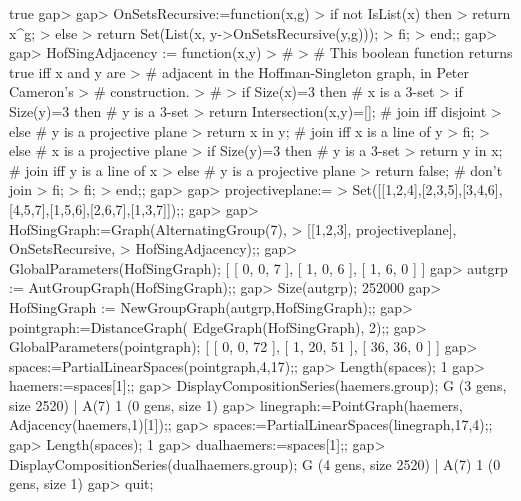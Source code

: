 true
gap> 
gap> OnSetsRecursive:=function(x,g)
> if not IsList(x) then
>   return x^g;     
> else
>   return Set(List(x, y->OnSetsRecursive(y,g)));
> fi;
> end;;
gap> 
gap> HofSingAdjacency := function(x,y)
> #
> # This boolean function returns  true  iff  x  and  y  are 
> # adjacent in the Hoffman-Singleton graph, in Peter Cameron's
> # construction.
> #
> if Size(x)=3 then                  # x is a 3-set
>    if Size(y)=3 then               # y is a 3-set
>       return Intersection(x,y)=[]; # join iff disjoint
>    else                            # y is a projective plane
>       return x in y;               # join iff x is a line of y
>    fi;
> else                               # x is a projective plane
>    if Size(y)=3 then               # y is a 3-set
>       return y in x;               # join iff y is a line of x
>    else                            # y is a projective plane
>       return false;                # don't join
>    fi;
> fi;
> end;;
gap> 
gap> projectiveplane:=
>    Set([[1,2,4],[2,3,5],[3,4,6],[4,5,7],[1,5,6],[2,6,7],[1,3,7]]);;
gap> 
gap> HofSingGraph:=Graph(AlternatingGroup(7), 
>                     [[1,2,3], projectiveplane], OnSetsRecursive,
>                     HofSingAdjacency);;
gap> GlobalParameters(HofSingGraph);
[ [ 0, 0, 7 ], [ 1, 0, 6 ], [ 1, 6, 0 ] ]
gap> autgrp := AutGroupGraph(HofSingGraph);;
gap> Size(autgrp);
252000
gap> HofSingGraph := NewGroupGraph(autgrp,HofSingGraph);;
gap> pointgraph:=DistanceGraph( EdgeGraph(HofSingGraph), 2);;
gap> GlobalParameters(pointgraph);
[ [ 0, 0, 72 ], [ 1, 20, 51 ], [ 36, 36, 0 ] ]
gap> spaces:=PartialLinearSpaces(pointgraph,4,17);;
gap> Length(spaces);
1
gap> haemers:=spaces[1];;
gap> DisplayCompositionSeries(haemers.group);
G (3 gens, size 2520)
 | A(7)
1 (0 gens, size 1)
gap> linegraph:=PointGraph(haemers, Adjacency(haemers,1)[1]);;
gap> spaces:=PartialLinearSpaces(linegraph,17,4);;
gap> Length(spaces);
1
gap> dualhaemers:=spaces[1];;
gap> DisplayCompositionSeries(dualhaemers.group);
G (4 gens, size 2520)
 | A(7)
1 (0 gens, size 1)
gap> quit;
\endexample
